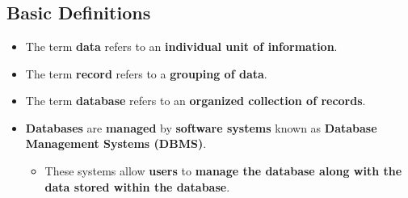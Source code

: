 \documentclass{article}
\begin{document}
    \section*{}

    \subsection*{Basic Definitions}
    \begin{itemize}
        \item The term \textbf{data} refers to an \textbf{individual unit of information}.
        \item The term \textbf{record} refers to a \textbf{grouping of data}.
        \item The term \textbf{database} refers to an \textbf{organized collection of records}.
        \item \textbf{Databases} are \textbf{managed} by \textbf{software systems} known as \textbf{Database Management Systems (DBMS)}.
        \begin{itemize}
            \item These systems allow \textbf{users} to \textbf{manage the database along with the data stored within the database}.
        \end{itemize}
    \end{itemize}
\end{document}
